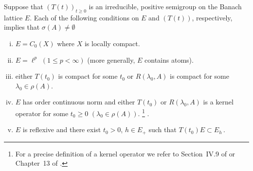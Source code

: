 \begin{theorem}\label{thm:c3-3.7}

Suppose that $(T(t))_{t\geq 0}$ is an irreducible, positive semigroup on the Banach lattice $E$.
Each of the following conditions on $E$ and $(T(t))$, respectively, implies that $\sigma(A) \neq \emptyset$

\begin{enumerate}[(i)]
	\item
	$E = C_{0}(X)$ where $X$ is locally compact.

	\item 
	$E = \ell^{p}$ $(1 \leq p < \infty)$ (more generally, $E$ contains atoms).

	\item either $T(t_{0})$ is compact for some $t_{0}$ or $R(\lambda_{0},A)$ is compact for some $\lambda_{0} \in \rho(A)$.
%
%
	\item 
	$E$ has order continuous norm and either $T(t_{0})$ or $R(\lambda_{0},A)$ is a kernel operator for some $t_{0} \geq 0$ $(\lambda_{0} \in \rho(A))$. 	
	\footnote[1]{For a precise definition of a kernel operator we refer to Section~IV.9 of \citet{schaefer:1974} or Chapter~13 of \citet{zaanen:1983}.}
	.

	\item 
	$E$ is reflexive and there exist $t_{0} > 0$, $h \in E_{+}$ such that $T(t_{0})E \subset E_{h}$\,.
\end{enumerate}
\end{theorem}
